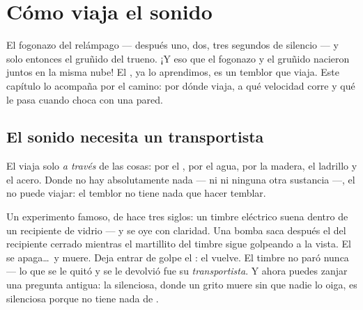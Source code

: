 \chapter{Cómo viaja el sonido}\label{ch:g4:how-sound-travels}

El fogonazo del relámpago --- después uno, dos, tres segundos de
silencio --- y solo entonces el gruñido del trueno. ¡Y eso que el
fogonazo y el gruñido nacieron juntos en la misma nube! El ,
ya lo aprendimos, es un temblor que viaja. Este capítulo lo acompaña
por el camino: por dónde viaja, a qué velocidad corre y qué le pasa
cuando choca con una pared.

\section{El sonido necesita un transportista}

\begin{proposition}\label{prop:g4:how-sound-travels:carrier}
El  viaja solo \emph{a través} de las cosas: por el ,
por el agua, por la madera, el ladrillo y el acero. Donde no hay
absolutamente nada --- ni  ni ninguna otra sustancia ---, el
 no puede viajar: el temblor no tiene nada que hacer temblar.
\end{proposition}

\begin{example}\label{ex:g4:how-sound-travels:jar}
Un experimento famoso, de hace tres siglos: un timbre eléctrico suena
dentro de un recipiente de vidrio --- y se oye con claridad. Una bomba
saca después el  del recipiente cerrado mientras el martillito del
timbre sigue golpeando a la vista. El  se apaga\dots\ y muere.
Deja entrar de golpe el : el  vuelve. El timbre no paró
nunca --- lo que se le quitó y se le devolvió fue su
\emph{transportista}. Y ahora puedes zanjar una pregunta antigua: la
 silenciosa, donde un grito muere sin que nadie lo oiga, es
silenciosa porque no tiene nada de .
\end{example}

